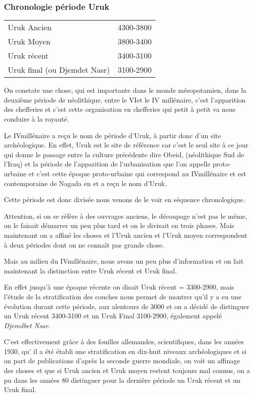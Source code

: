 \documentclass[a4paper,10pt]{article}
\begin{document}
\subsubsection{Chronologie période Uruk}

\begin{tabular}{ll}
  Uruk Ancien & 4300-3800 \\
  Uruk Moyen & 3800-3400 \\
  Uruk récent & 3400-3100 \\
  Uruk final (ou Djemdet Nasr) & 3100-2900  \\
\end{tabular}

\espace
On constate une chose, qui est importante dans le monde mésopotamien, 
dans la deuxième période de néolithique, entre le VI\ieme et le IV\ieme 
millénaire, c'est l'apparition des chefferies et c'est cette organisation 
en chefferies qui petit à petit va nous conduire à la royauté.

Le IV\ieme millénaire a reçu le nom de période d'Uruk, à partir donc 
d'un site archéologique. En effet, Uruk est le site de référence car 
c'est le seul site à ce jour qui donne le passage entre la culture 
précédente dire Obeid, (néolithique Sud de l'Iraq) et la période de 
l'apparition de l'urbanisation que l'on appelle proto-urbaine et c'est 
cette époque proto-urbaine qui correspond au IV\ieme millénaire et est 
contemporaine de Nagada en \kmt et a reçu le nom d'Uruk.

Cette période est donc divisée nous venons de le voir en séquence 
chronologique.

Attention, si on se réfère à des ouvrages anciens, le découpage n'est 
pas le même, on le faisait démarrer un peu plus tard et on le divisait 
en trois phases. Mais maintenant on a affiné les choses et l'Uruk ancien 
et l'Uruk moyen correspondent à deux périodes dont on ne connaît pas 
grande chose.

Mais au milieu du IV\ieme millénaire, nous avons un peu plus d'information 
et on fait maintenant la distinction entre Uruk récent et Uruk final.

En effet jusqu'à une époque récente on disait Uruk récent = 3300-2900, 
mais l'étude de la stratification des couches nous permet de montrer 
qu'il y a eu une évolution durant cette période, aux alentours de 3000 
et on a décidé de distinguer un Uruk récent 3400-3100 et un Uruk Final 
3100-2900, également appelé \emph{Djemdbet Nsar}.

C'est effectivement grâce à des fouilles allemandes, scientifiques, 
dans les années 1930, qu' il a été établi une stratification en dix-huit 
niveaux archéologiques et si on part de publications d'après la seconde 
guerre mondiale, on voit un affinage des choses et que si Uruk ancien et 
Uruk moyen restent toujours mal connus, on a pu dans les années 80 
distinguer pour la dernière période un Uruk récent et un Uruk final.
\end{document}
